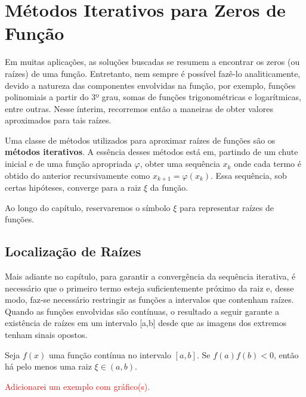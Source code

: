 \chapter{Métodos Iterativos para Zeros de Função}

Em muitas aplicações, as soluções buscadas se resumem a encontrar os zeros (ou raízes) de uma função. Entretanto, nem sempre é possível fazê-lo analiticamente, devido a natureza das componentes envolvidas na função, por exemplo, funções polinomiais a partir do 3º grau, somas de funções trigonométricas e logarítmicas, entre outras. Nesse ínterim, recorremos então a maneiras de obter valores aproximados para tais raízes. 

Uma classe de métodos utilizados para aproximar raízes de funções são os \textbf{métodos iterativos}. A essência desses métodos está em, partindo de um chute inicial e de uma função apropriada $\varphi$, obter uma sequência $x_k$ onde cada termo é obtido do anterior recursivamente como $x_{k+1} = \varphi(x_k)$. Essa sequência, sob certas hipóteses, converge para a raiz $\xi$ da função.

Ao longo do capítulo, reservaremos o símbolo $\xi$ para representar raízes de funções.

\section{Localização de Raízes}

Mais adiante no capítulo, para garantir a convergência da sequência iterativa, é necessário que o primeiro termo esteja suficientemente próximo da raiz e, desse modo, faz-se necessário restringir as funções a intervalos que contenham raízes. Quando as funções envolvidas são contínuas, o resultado a seguir garante a existência de raízes em um intervalo [a,b] desde que as imagens dos extremos tenham sinais opostos.


\begin{prop}
Seja $f(x)$ uma função contínua no intervalo $[a, b]$. Se $f(a)f(b) < 0$, então há pelo menos uma raiz $\xi \in (a,b)$.
\end{prop}

\textcolor{red}{Adicionarei um exemplo com gráfico(s).}

